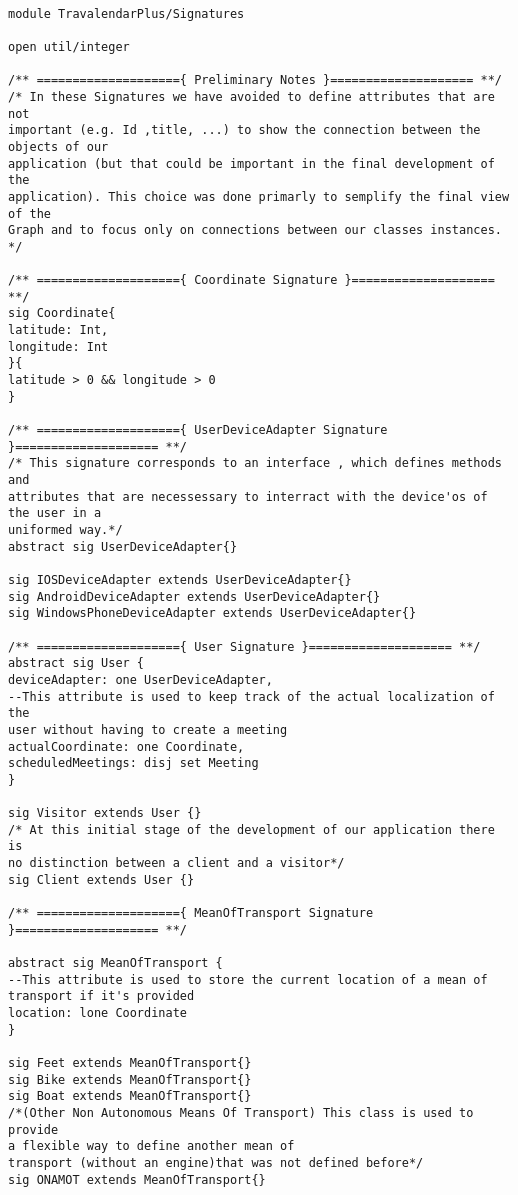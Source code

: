 \documentclass[a4paper,leqno]{book}
\begin{document}
\begin{lstlisting}

module TravalendarPlus/Signatures

open util/integer

/** ===================={ Preliminary Notes }==================== **/
/* In these Signatures we have avoided to define attributes that are not 
important (e.g. Id ,title, ...) to show the connection between the objects of our 
application (but that could be important in the final development of the
application). This choice was done primarly to semplify the final view of the
Graph and to focus only on connections between our classes instances.
*/

/** ===================={ Coordinate Signature }==================== **/
sig Coordinate{
latitude: Int,
longitude: Int
}{
latitude > 0 && longitude > 0
}

/** ===================={ UserDeviceAdapter Signature }==================== **/
/* This signature corresponds to an interface , which defines methods and
attributes that are necessessary to interract with the device'os of the user in a
uniformed way.*/
abstract sig UserDeviceAdapter{}

sig IOSDeviceAdapter extends UserDeviceAdapter{}
sig AndroidDeviceAdapter extends UserDeviceAdapter{}
sig WindowsPhoneDeviceAdapter extends UserDeviceAdapter{}

/** ===================={ User Signature }==================== **/
abstract sig User {
deviceAdapter: one UserDeviceAdapter,
--This attribute is used to keep track of the actual localization of the
user without having to create a meeting
actualCoordinate: one Coordinate,
scheduledMeetings: disj set Meeting
}

sig Visitor extends User {}
/* At this initial stage of the development of our application there is
no distinction between a client and a visitor*/
sig Client extends User {}

/** ===================={ MeanOfTransport Signature }==================== **/

abstract sig MeanOfTransport {
--This attribute is used to store the current location of a mean of
transport if it's provided
location: lone Coordinate
}

sig Feet extends MeanOfTransport{}
sig Bike extends MeanOfTransport{}
sig Boat extends MeanOfTransport{}
/*(Other Non Autonomous Means Of Transport) This class is used to provide
a flexible way to define another mean of
transport (without an engine)that was not defined before*/
sig ONAMOT extends MeanOfTransport{}


\end{lstlisting}
\end{document}
